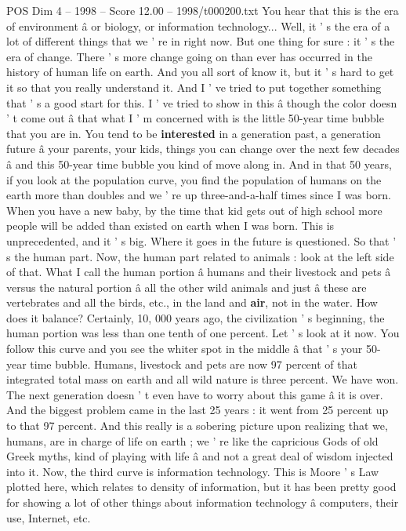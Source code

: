 \begin{textsample}{POS Dim 4 – 1998 – Score 12.00 – 1998/t000200.txt}  \label{ex:f4_pos_013}
You hear that this is the era of environment â or biology, or information technology...
Well, it ' s the era of a lot of different things that we ' re in right now.
But one thing for sure : it ' s the era of change.
There ' s more change going on than ever has occurred in the history of human life on earth.
And you all sort of know it, but it ' s hard to get it so that you really understand it.
And I ' ve tried to put together something that ' s a good start for this.
I ' ve tried to show in this â though the color doesn ' t come out â that what I ' m concerned with is the little 50-year time bubble that you are in.
You tend to be \textbf{interested} in a generation past, a generation future â your parents, your kids, things you can change over the next few decades â and this 50-year time bubble you kind of move along in.
And in that 50 years, if you look at the population curve, you find the population of humans on the earth more than doubles and we ' re up three-and-a-half times since I was born.
When you have a new baby, by the time that kid gets out of high school more people will be added than existed on earth when I was born.
This is unprecedented, and it ' s big.
Where it goes in the future is questioned.
So that ' s the human part.
Now, the human part related to animals : look at the left side of that.
What I call the human portion â humans and their livestock and pets â versus the natural portion â all the other wild animals and just â these are vertebrates and all the birds, etc., in the land and \textbf{air}, not in the water.
How does it balance?
Certainly, 10, 000 years ago, the civilization ' s beginning, the human portion was less than one tenth of one percent.
Let ' s look at it now.
You follow this curve and you see the whiter spot in the middle â that ' s your 50- year time bubble.
Humans, livestock and pets are now 97 percent of that integrated total mass on earth and all wild nature is three percent.
We have won.
The next generation doesn ' t even have to worry about this game â it is over.
And the biggest problem came in the last 25 years : it went from 25 percent up to that 97 percent.
And this really is a sobering picture upon realizing that we, humans, are in charge of life on earth ; we ' re like the capricious Gods of old Greek myths, kind of playing with life â and not a great deal of wisdom injected into it.
Now, the third curve is information technology.
This is Moore ' s Law plotted here, which relates to density of information, but it has been pretty good for showing a lot of other things about information technology â computers, their use, Internet, etc.

\end{textsample}
